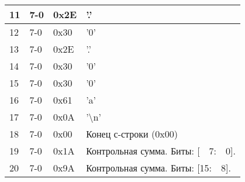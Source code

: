 \begin{longtable}{|C{15mm}|C{15mm}|C{30mm}|L{80mm}|}
%    
    11  & 7-0 & 0x2E  &  '.'\\ \hline
{}%
    12  & 7-0 & 0x30  &  '0'\\ \hline
{}%
    13  & 7-0 & 0x2E  &  '.'\\ \hline
{}%
    14  & 7-0 & 0x30  &  '0'\\ \hline
{}%
    15  & 7-0 & 0x30  &  '0'\\ \hline
{}%
    16  & 7-0 & 0x61  &  'a'\\ \hline 
{}%
    17  & 7-0 & 0x0A  &  '\textbackslash n' \\ \hline
{}%
    18  & 7-0 & 0x00  & Конец с-строки (0x00)\\ \hline 
{}%
    19  & 7-0 & 0x1A  & Контрольная сумма. Биты: [\ \ 7:\ \ 0]. \\ \hline  
{}%
    20  & 7-0 & 0x9A  & Контрольная сумма. Биты: [15:\ \ 8]. \\ \hline  
\end{longtable} \normalsize





